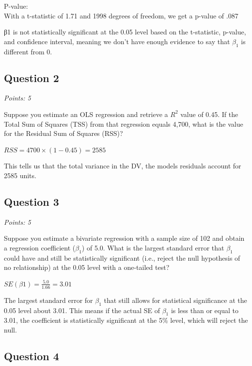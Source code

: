 \documentclass[
  letterpaper,
  DIV=11,
  numbers=noendperiod]{scrartcl}
\begin{document}
P-value:\\
With a t-statistic of 1.71 and 1998 degrees of freedom, we get a p-value
of .087

β1\hspace{0pt} is not statistically significant at the 0.05 level based
on the t-statistic, p-value, and confidence interval, meaning we don't
have enough evidence to say that \(\beta_1\)\hspace{0pt} is different
from 0.

\hypertarget{question-2}{%
\subsection{Question 2}\label{question-2}}

\emph{Points: 5}

Suppose you estimate an OLS regression and retrieve a \(R^2\) value of
0.45. If the Total Sum of Squares (TSS) from that regression equals
4,700, what is the value for the Residual Sum of Squares (RSS)?

\(RSS = 4700\times(1-0.45)= 2585\)

This tells us that the total variance in the DV, the models residuals
account for 2585 units.

\hypertarget{question-3}{%
\subsection{Question 3}\label{question-3}}

\emph{Points: 5}

Suppose you estimate a bivariate regression with a sample size of 102
and obtain a regression coefficient (\(\beta_1\)) of 5.0. What is the
largest standard error that \(\beta_1\) could have and still be
statistically significant (i.e., reject the null hypothesis of no
relationship) at the 0.05 level with a one-tailed test?

\(SE(β1​) = \frac{5.0}{1.66} = 3.01\)

The largest standard error for \(\beta_1\) that still allows for
statistical significance at the 0.05 level about 3.01. This means if the
actual SE of \(\beta_1\) \hspace{0pt} is less than or equal to 3.01, the
coefficient is statistically significant at the 5\% level, which will
reject the null.

\hypertarget{question-4}{%
\subsection{Question 4}\label{question-4}}
\end{document}
